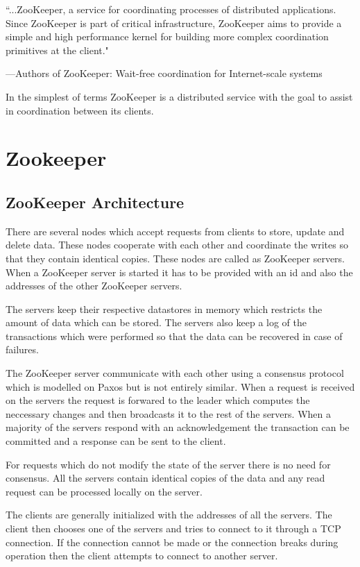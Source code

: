 \epigraph{``...ZooKeeper, a service for coordinating processes of distributed applications. Since ZooKeeper is part of critical infrastructure, ZooKeeper aims to provide a simple and high performance kernel for building more complex coordination primitives at the client."}{---Authors of \textup{ZooKeeper: Wait-free coordination for Internet-scale systems}}

    In the simplest of terms ZooKeeper is a distributed service with the goal to assist in coordination between its clients.

\chapter{Zookeeper}
\section{ZooKeeper Architecture}

There are several nodes which accept requests from clients to store, update and delete data. These nodes cooperate with each other and coordinate the writes so that they contain identical copies. These nodes are called as ZooKeeper servers. When a ZooKeeper server is started it has to be provided with an id and also the addresses of the other ZooKeeper servers. 

The servers keep their respective datastores in memory which restricts the amount of data which can be stored. The servers also keep a log of the transactions which were performed so that the data can be recovered in case of failures.



The ZooKeeper server communicate with each other using a consensus protocol which is modelled on Paxos but is not entirely similar. When a request is received on the servers the request is forwared to the leader which computes the neccessary changes and then broadcasts it to the rest of the servers. When a majority of the servers respond with an acknowledgement the transaction can be committed and a response can be sent to the client. 

For requests which do not modify the state of the server there is no need for consensus. All the servers contain identical copies of the data and any read request can be processed locally on the server. 

The clients are generally initialized with the addresses of all the servers. The client then chooses one of the servers and tries to connect to it through a TCP connection. If the connection cannot be made or the connection breaks during operation then the client attempts to connect to another server.

